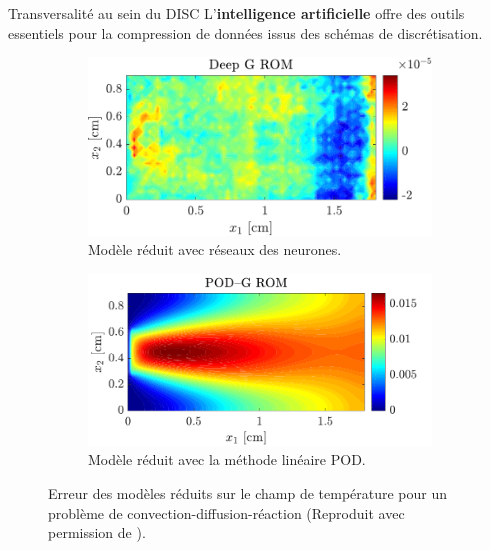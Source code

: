 \documentclass[aspectratio=169, french]{beamer}
\begin{document}
\begin{frame}{Transversalité au sein du DISC}
	L'\textbf{intelligence artificielle} offre des outils essentiels pour la compression de données issus des schémas de discrétisation.
	
	\begin{figure}[t]
		\begin{subfigure}[t]{0.48\textwidth}
			\includegraphics[width=\columnwidth]{DGROM_T_param1.pdf} 
			\caption*{Modèle réduit avec réseaux des neurones.}
		\end{subfigure}\hfill
		\begin{subfigure}[t]{0.48\textwidth}
			\includegraphics[width=\columnwidth]{GROM_T_param1.pdf}%
			\caption*{Modèle réduit avec la méthode linéaire POD.}
			\label{fig:POD_ROM}
		\end{subfigure}
		\caption*{Erreur des modèles réduits sur le champ de température pour un problème de convection-diffusion-réaction (Reproduit avec permission de \cite{lee2020}).}%
		\label{fig:deepROM}%
	\end{figure}
\end{frame}
\end{document}
